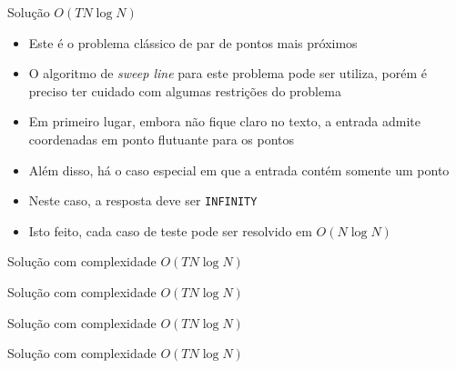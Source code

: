 \begin{frame}[fragile]{Solução $O(TN\log N)$}

    \begin{itemize}
        \item Este é o problema clássico de par de pontos mais próximos

        \item O algoritmo de \textit{sweep line} para este problema pode ser utiliza,
            porém é preciso ter cuidado com algumas restrições do problema

        \item Em primeiro lugar, embora não fique claro no texto, a entrada admite coordenadas
            em ponto flutuante para os pontos

        \item Além disso, há o caso especial em que a entrada contém somente um ponto

        \item Neste caso, a resposta deve ser \texttt{INFINITY}

        \item Isto feito, cada caso de teste pode ser resolvido em $O(N\log N)$
    \end{itemize}

\end{frame}

\begin{frame}[fragile]{Solução com complexidade $O(TN\log N)$}
\end{frame}

\begin{frame}[fragile]{Solução com complexidade $O(TN\log N)$}
\end{frame}

\begin{frame}[fragile]{Solução com complexidade $O(TN\log N)$}
\end{frame}

\begin{frame}[fragile]{Solução com complexidade $O(TN\log N)$}
\end{frame}




